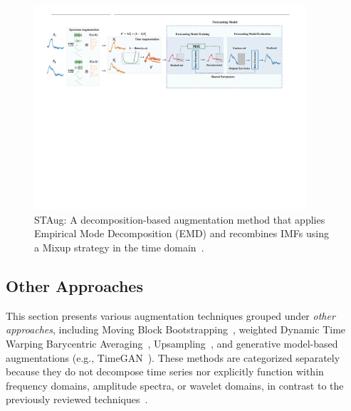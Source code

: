 \begin{figure}[h!]
    \centering
    \includegraphics[page=1, width=0.9\textwidth]{./images/staug.pdf}
    \caption{STAug: A decomposition-based augmentation method that applies Empirical Mode Decomposition (EMD) and recombines IMFs using a Mixup strategy in the time domain~\cite{zhang2023diversecoherentaugmentationtimeseries}.}
    \label{fig:staug}
\end{figure}



\subsection{Other Approaches} \label{section:other}

This section presents various augmentation techniques grouped under \emph{other approaches}, including Moving Block Bootstrapping~\cite{mbb}, weighted Dynamic Time Warping Barycentric Averaging~\cite{asd}, Upsampling~\cite{upsample}, and generative model-based augmentations (e.g., TimeGAN~\cite{timegan}). These methods are categorized separately because they do not decompose time series nor explicitly function within frequency domains, amplitude spectra, or wavelet domains, in contrast to the previously reviewed techniques~\cite{asd, mbb, upsample, timegan}. 

